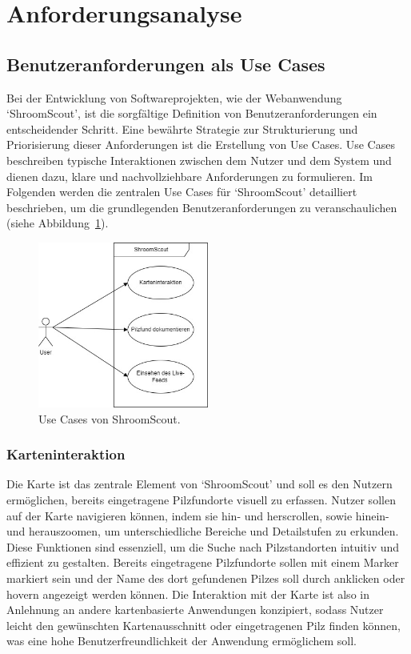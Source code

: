 \section{Anforderungsanalyse}

\subsection{Benutzeranforderungen als Use Cases}

Bei der Entwicklung von Softwareprojekten, wie der Webanwendung `ShroomScout', ist die sorgfältige Definition von
Benutzeranforderungen ein entscheidender Schritt. Eine bewährte Strategie zur Strukturierung und Priorisierung dieser
Anforderungen ist die Erstellung von Use Cases. Use Cases beschreiben typische Interaktionen zwischen dem Nutzer und
dem System und dienen dazu, klare und nachvollziehbare Anforderungen zu formulieren. Im Folgenden werden die zentralen
Use Cases für `ShroomScout' detailliert beschrieben, um die grundlegenden Benutzeranforderungen zu veranschaulichen
(siehe Abbildung~\ref{fig:UseCase_Diagramm}).

\begin{figure}[ht]
	\centering
	\includegraphics[width=0.5\textwidth]{abbildungen/UseCaseDiagrammDrawio.jpg}
	\caption{Use Cases von ShroomScout.}
	\label{fig:UseCase_Diagramm}
\end{figure}

\subsubsection{Karteninteraktion}

Die Karte ist das zentrale Element von `ShroomScout' und soll es den Nutzern er\-mög\-lich\-en, bereits eingetragene Pilzfundorte
visuell zu erfassen. Nutzer sollen auf der Karte navigieren können, indem sie hin- und herscrollen, sowie hinein- und herauszoomen,
um unterschiedliche Bereiche und Detailstufen zu erkunden. Diese Funktionen sind essenziell, um die Suche nach Pilzstandorten
intuitiv und effizient zu gestalten. Bereits eingetragene Pilzfundorte sollen mit einem Marker markiert sein und der Name des
dort gefundenen Pilzes soll durch anklicken oder hovern angezeigt werden können. Die Interaktion mit der Karte ist also in
Anlehnung an andere kartenbasierte Anwendungen konzipiert, sodass Nutzer leicht den gewünschten Kartenausschnitt oder
eingetragenen Pilz finden können, was eine hohe Benutzerfreundlichkeit der Anwendung ermöglichem soll.

